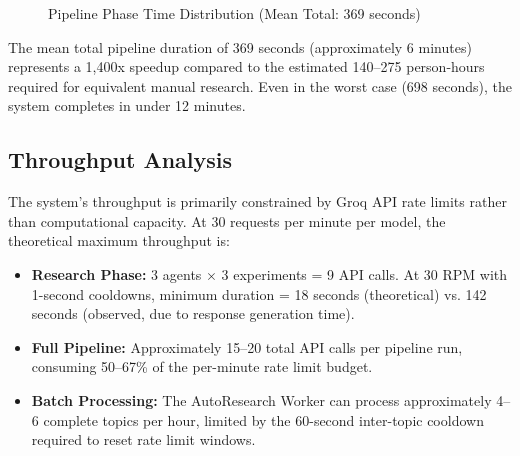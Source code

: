 \documentclass[a4paper,12pt,openany]{report}
\begin{document}
\begin{figure}[H]
\centering
{}
\caption{Pipeline Phase Time Distribution (Mean Total: 369 seconds)}
\label{fig:time_dist}
\end{figure}


The mean total pipeline duration of 369 seconds (approximately 6 minutes) represents a 1,400x speedup compared to the estimated 140--275 person-hours required for equivalent manual research. Even in the worst case (698 seconds), the system completes in under 12 minutes.

\subsection{Throughput Analysis}

The system's throughput is primarily constrained by Groq API rate limits rather than computational capacity. At 30 requests per minute per model, the theoretical maximum throughput is:

\begin{itemize}[leftmargin=2cm]
\item \textbf{Research Phase:} 3 agents $\times$ 3 experiments = 9 API calls. At 30 RPM with 1-second cooldowns, minimum duration = 18 seconds (theoretical) vs. 142 seconds (observed, due to response generation time).
\item \textbf{Full Pipeline:} Approximately 15--20 total API calls per pipeline run, consuming 50--67\% of the per-minute rate limit budget.
\item \textbf{Batch Processing:} The AutoResearch Worker can process approximately 4--6 complete topics per hour, limited by the 60-second inter-topic cooldown required to reset rate limit windows.
\end{itemize}
\end{document}
